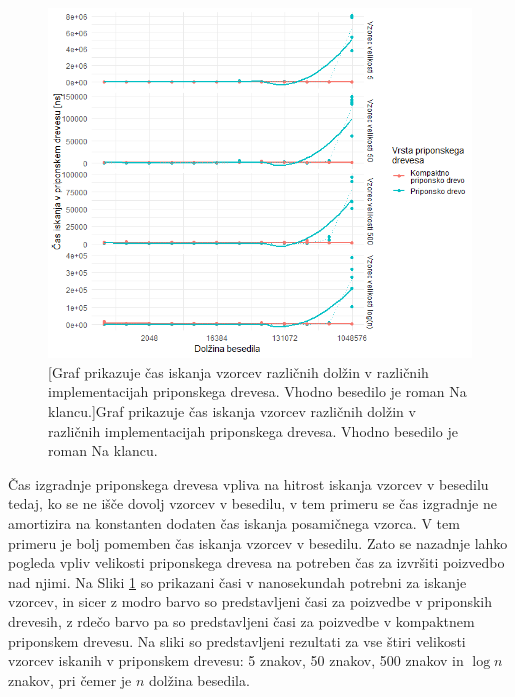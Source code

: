 \begin{figure}[htb]
    \includegraphics[width=\textwidth]{Slike/IskanjeNovPCSLO.png}
    [Graf prikazuje čas iskanja vzorcev različnih dolžin v različnih implementacijah priponskega drevesa. Vhodno besedilo je roman Na klancu.]{Graf prikazuje čas iskanja vzorcev različnih dolžin v različnih implementacijah priponskega drevesa. Vhodno besedilo je roman Na klancu.} 
    \label{fig:IskanjeGrafSLO}
\end{figure}

Čas izgradnje priponskega drevesa vpliva na hitrost iskanja  vzorcev v besedilu tedaj, ko se ne išče dovolj vzorcev v besedilu, v tem primeru se čas izgradnje ne amortizira na konstanten dodaten čas iskanja posamičnega vzorca. V tem primeru je bolj pomemben čas iskanja vzorcev v besedilu. Zato se nazadnje lahko pogleda vpliv velikosti priponskega drevesa na potreben čas za izvršiti poizvedbo nad njimi. Na Sliki \ref{fig:IskanjeGrafSLO} so prikazani časi v nanosekundah potrebni za iskanje vzorcev, in sicer z modro barvo so predstavljeni časi za poizvedbe v priponskih drevesih, z rdečo barvo pa so predstavljeni časi za poizvedbe v kompaktnem priponskem drevesu. Na sliki so predstavljeni rezultati za vse štiri velikosti vzorcev iskanih v priponskem drevesu: 5 znakov, 50 znakov, 500 znakov in $\log{n}$ znakov, pri čemer je $n$ dolžina besedila.

